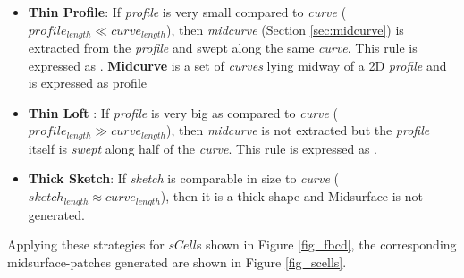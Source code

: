 \begin{itemize}[noitemsep,topsep=2pt,parsep=2pt,partopsep=2pt]

\item {\bf Thin Profile}: If {\em profile} is very small compared to {\em curve} ( $profile_{length} \ll curve_{length}$), then {\em midcurve} (Section \ref{sec:midcurve}) is extracted from the {\em profile} and swept  along the same {\em curve}. This rule is expressed as  . {\bf Midcurve} is a set of {\em curves} lying midway of a 2D {\em profile} and is expressed as 	 {profile} 





\item {\bf Thin Loft} :  If {\em profile} is very big as compared to {\em curve} ($profile_{length} \gg curve_{length}$), then {\em midcurve} is not extracted  but the {\em profile} itself is {\em swept} along half of the {\em curve}. This rule is expressed as .
%

\item {\bf Thick Sketch}:   If {\em sketch} is comparable in size to {\em curve}  ($sketch_{length} \approx curve_{length}$), then it is a thick shape and Midsurface is not generated.

\end{itemize}

Applying these strategies for $sCell$s shown in Figure \ref{fig_fbcd}, the corresponding midsurface-patches generated are shown in Figure \ref{fig_scells}. 
	
